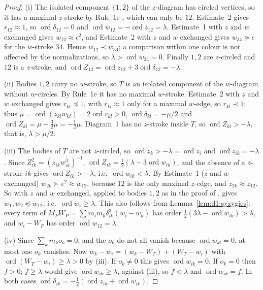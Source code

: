\documentclass[11pt]{amsart}
\theoremstyle{definition}
\theoremstyle{remark}
\newcommand{\ord}{\operatorname{ord}}
\begin{document}
\begin{proof}
(i) The isolated component $\{1,2\}$ of the $z$-diagram has circled vertices, so it has a
maximal $z$-stroke by Rule~1e \cite[p.~546]{AK}, which can only be $12$.  Estimate~2
\cite[p.~548]{AK} gives $r_{12}\approx1$, so $\ord\delta_{12}=0$ and $\ord w_{12}=-\ord
z_{12}=\lambda$.  Estimate~1 \cite[p.~548]{AK} with $z$ and $w$ exchanged gives
$w_{12}\approx\epsilon^2$, and Estimate~2 with $z$ and $w$ exchanged gives $w_{34}\succcurlyeq\epsilon$
for the $w$-stroke $34$.  Hence $w_{12}\prec w_{34}$; a comparison within one colour is not
affected by the normalizations, so $\lambda>\ord w_{34}=0$.  Finally $1,2$ are $z$-circled and
$12$ is a $z$-stroke, and $\ord Z_{12}=\ord z_{12}+3\ord\delta_{12}=-\lambda$.

(ii) Bodies $1,2$ carry no $w$-stroke, so $T$ is an isolated component of the $w$-diagram
without $w$-circles.  By Rule~1e it has no maximal $w$-stroke.  Estimate~2 with $z$ and $w$
exchanged gives $r_{kl}\preccurlyeq1$, with $r_{kl}\approx1$ only for a maximal $w$-edge, so
$r_{kl}\prec1$; thus $\mu=\ord(z_{kl}w_{kl})=2\ord r_{kl}>0$, $\ord\delta_{kl}=
-\mu/2$ and $\ord Z_{kl}=\mu-\frac32\mu=-\frac12\mu$.  Diagram~1 has no $z$-stroke inside $T$, so
$\ord Z_{kl}>-\lambda$, that is, $\lambda>\mu/2$.

(iii) The bodies of $T$ are not $z$-circled, so $\ord z_k>-\lambda=\ord z_i$ and $\ord
z_{ik}=-\lambda$.  Since $Z_{ik}^2=(z_{ik}w_{ik}^3)^{-1}$, $\ord Z_{ik}=\frac12(\lambda-3\ord
w_{ik})$, and the absence of a $z$-stroke $ik$ gives $\ord Z_{ik}>-\lambda$, i.e.\ $\ord
w_{ik}<\lambda$.  By Estimate~1 ($z$ and $w$ exchanged) $w_{2k}\succ\epsilon^2\approx w_{12}$,
because $12$ is the only maximal $z$-edge, and $z_{2k}\approx z_{12}$.  So
\cite[Prop.~1, p.~559]{AK} with $z$ and $w$ exchanged, applied to bodies $1,2$ as in the proof of
\cite[Prop.~4, p.~564]{AK}, gives $w_1,w_2\preccurlyeq w_{12}$, i.e.\ $\ord w_i\ge\lambda$.  This
also follows from Lemma~\ref{lem:d1-syzygies}: every term of $M_PW_P=\sum m_im_k\delta_{ik}^3
(w_i-w_k)$ has order $\frac12(3\lambda-\ord w_{ik})>\lambda$, and $w_i-W_P$ has order
$\ord w_{12}=\lambda$.

(iv) Since $\sum_km_ko_k=0$, and the $o_k$ do not all vanish because $\ord w_{kl}=0$, at most one
$o_k$ vanishes.  Now $w_k-w_i=(w_k-W_T)+(W_T-w_i)$ with $\ord(W_T-w_i)\ge\lambda>0$ by (iii).  If
$o_k\ne0$ this gives $\ord w_{ik}=0$.  If $o_k=0$ then $f>0$; $f\ge\lambda$ would give $\ord
w_{ik}\ge\lambda$, against (iii), so $f<\lambda$ and $\ord w_{ik}=f$.  In both cases
$\ord\delta_{ik}=-\frac12(\ord z_{ik}+\ord w_{ik})$.
\end{proof}
\end{document}
